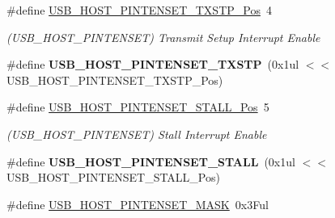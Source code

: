 \begin{DoxyCompactItemize}
\item 
\hypertarget{group___s_a_m_l21___u_s_b_ga2410505b193a7d1db8d6293994c9319c}{}\#define \hyperlink{group___s_a_m_l21___u_s_b_ga2410505b193a7d1db8d6293994c9319c}{U\+S\+B\+\_\+\+H\+O\+S\+T\+\_\+\+P\+I\+N\+T\+E\+N\+S\+E\+T\+\_\+\+T\+X\+S\+T\+P\+\_\+\+Pos}~4\label{group___s_a_m_l21___u_s_b_ga2410505b193a7d1db8d6293994c9319c}

\begin{DoxyCompactList}\small\item\em (U\+S\+B\+\_\+\+H\+O\+S\+T\+\_\+\+P\+I\+N\+T\+E\+N\+S\+E\+T) Transmit Setup Interrupt Enable \end{DoxyCompactList}\item 
\hypertarget{group___s_a_m_l21___u_s_b_ga431649b66bd8ce9fd55f8dc2aed7f222}{}\#define {\bfseries U\+S\+B\+\_\+\+H\+O\+S\+T\+\_\+\+P\+I\+N\+T\+E\+N\+S\+E\+T\+\_\+\+T\+X\+S\+T\+P}~(0x1ul $<$$<$ U\+S\+B\+\_\+\+H\+O\+S\+T\+\_\+\+P\+I\+N\+T\+E\+N\+S\+E\+T\+\_\+\+T\+X\+S\+T\+P\+\_\+\+Pos)\label{group___s_a_m_l21___u_s_b_ga431649b66bd8ce9fd55f8dc2aed7f222}

\item 
\hypertarget{group___s_a_m_l21___u_s_b_ga969e85524bf49ef867a07ea10cca9b94}{}\#define \hyperlink{group___s_a_m_l21___u_s_b_ga969e85524bf49ef867a07ea10cca9b94}{U\+S\+B\+\_\+\+H\+O\+S\+T\+\_\+\+P\+I\+N\+T\+E\+N\+S\+E\+T\+\_\+\+S\+T\+A\+L\+L\+\_\+\+Pos}~5\label{group___s_a_m_l21___u_s_b_ga969e85524bf49ef867a07ea10cca9b94}

\begin{DoxyCompactList}\small\item\em (U\+S\+B\+\_\+\+H\+O\+S\+T\+\_\+\+P\+I\+N\+T\+E\+N\+S\+E\+T) Stall Interrupt Enable \end{DoxyCompactList}\item 
\hypertarget{group___s_a_m_l21___u_s_b_ga8c81c94384f35c39ee6d62a8f2792455}{}\#define {\bfseries U\+S\+B\+\_\+\+H\+O\+S\+T\+\_\+\+P\+I\+N\+T\+E\+N\+S\+E\+T\+\_\+\+S\+T\+A\+L\+L}~(0x1ul $<$$<$ U\+S\+B\+\_\+\+H\+O\+S\+T\+\_\+\+P\+I\+N\+T\+E\+N\+S\+E\+T\+\_\+\+S\+T\+A\+L\+L\+\_\+\+Pos)\label{group___s_a_m_l21___u_s_b_ga8c81c94384f35c39ee6d62a8f2792455}

\item 
\hypertarget{group___s_a_m_l21___u_s_b_ga567e00522894dfb4cce2a07fd7d7753f}{}\#define \hyperlink{group___s_a_m_l21___u_s_b_ga567e00522894dfb4cce2a07fd7d7753f}{U\+S\+B\+\_\+\+H\+O\+S\+T\+\_\+\+P\+I\+N\+T\+E\+N\+S\+E\+T\+\_\+\+M\+A\+S\+K}~0x3\+Ful\label{group___s_a_m_l21___u_s_b_ga567e00522894dfb4cce2a07fd7d7753f}


\end{DoxyCompactItemize}
